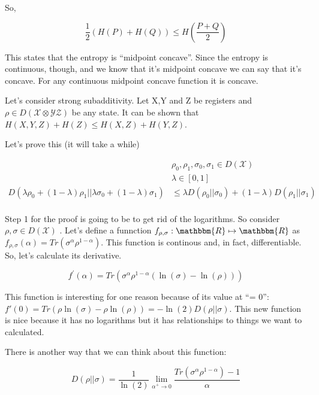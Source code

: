 \documentclass{article}
\begin{document}
        So,
        
        \[
                \frac{1}{2}\left( H(P)+H(Q) \right) \le H(\frac{P+Q}{2})
        \]

        This states that the entropy is ``midpoint concave''.  Since the
        entropy is continuous, though, and we know that it's midpoint
        concave we can say that it's concave. For any continuous
        midpoint concave function it is concave.

        Let's consider strong subadditivity. Let X,Y and Z be registers
        and $ \rho \in D(\mathcal{X} \otimes \mathcal{Y} \mathcal{Z}) $
        be any state. It can be shown that $ H(X,Y,Z) + H(Z) \le H(X,Z)
        + H(Y,Z)$.

        Let's prove this (it will take a while)

        \begin{align*}
            &\rho_0, \rho_1, \sigma_0, \sigma_1 \in D(\mathcal{X}) \\
            &\lambda \in [0,1] \\
            D(\lambda \rho_0 + (1-\lambda) \rho_1 || \lambda \sigma_0 +
            (1-\lambda)\sigma_1) &\le \lambda D(\rho_0 || \sigma_0) +
            (1-\lambda)D(\rho_1 || \sigma_1) \\
        \end{align*}

        Step 1 for the proof is going to be to get rid of the
        logarithms. So consider $ \rho, \sigma \in D(\mathcal{X}) $ .
        Let's define a funnction $ f_{\rho,\sigma} : \mathbbm{R} \mapsto
        \mathbbm{R}$ as $ f_{\rho,\sigma}(\alpha) = Tr(\sigma^\alpha
        \rho^{1-\alpha}) $. This function is continous and, in fact,
        differentiable. So, let's calculate its derivative.

        \[ 
                f^{'}(\alpha) = Tr(\sigma^\alpha
                \rho^{1-\alpha}(\ln(\sigma) -\ln(\rho))) 
        \]
        
        This function is interesting for one reason because of its
        value at ``\alpha = 0'': $ f'(0) =Tr\left(\rho \ln(\sigma) - \rho
        \ln(\rho)\right) = - \ln(2)D(\rho || \sigma) $. This new
        function is nice because it has no logarithms but it has
        relationships to things we want to calculated.

        There is another way that we can think about this function:

        \[ 
                D(\rho || \sigma) = \frac{1}{\ln(2)}
    \lim\limits_{\alpha^+ \rightarrow 0} \frac{Tr\left(\sigma^\alpha
    \rho^{1-\alpha}\right) - 1 }{\alpha}
        \]
\end{document}

